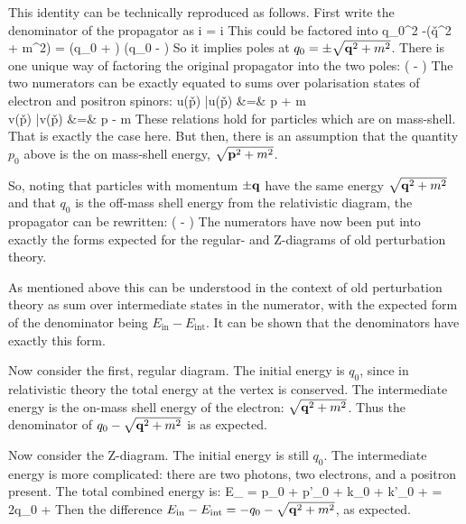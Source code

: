 This identity can be technically reproduced as follows.  First write the denominator of the propagator as
\beq
	i   = i 
\eeq
This could be factored into 
\beq
	q_0^2 -(\v{q}^2 + m^2) = (q_0 + )  (q_0 - )
\eeq
So it implies poles at $q_0 = \pm  \sqrt{\mathbf{q}^2 + m^2}$.  There is one unique way of factoring the original propagator into the two poles:
\beq
		\left(
			- 
		\right)
\eeq
The two numerators can be exactly equated to sums over polarisation states of electron and positron spinors:
\beqa
	\Sigma u(\v{p}) \bar{u}(\v{p}) &=& \gamma \cdot p + m	\\
	\Sigma v(\v{p}) \bar{v}(\v{p}) &=& \gamma \cdot p - m	
\eeqa
These relations hold for particles which are on mass-shell.  That is exactly the case here.  But then, there is an assumption that the quantity $p_0$ above is the on mass-shell energy, $\sqrt{\mathbf{p}^2 + m^2}$.

So, noting that particles with momentum $\pm \mathbf{q}$ have the same energy $\sqrt{\mathbf{q}^2 + m^2}$ and that $q_0$ is the off-mass shell energy from the relativistic diagram, the propagator can be rewritten:
\beq
		\left(
			- 
		\right)
\eeq
The numerators have now been put into exactly the forms expected for the regular- and Z-diagrams of old perturbation theory. 


As mentioned above this can be understood in the context of old perturbation theory as sum over intermediate states in the numerator,  with the expected form of the denominator being $E_\text{in} - E_\text{int}$.  It can be shown that the denominators have exactly this form. 

Now consider the first, regular diagram.  The initial energy is $q_0$, since in relativistic theory the total energy at the vertex is conserved.  The intermediate energy is the on-mass shell energy of the electron: $\sqrt{\mathbf{q}^2+ m^2}$.  Thus the denominator of $q_0 - \sqrt{\mathbf{q}^2+ m^2}$ is as expected.

Now consider the Z-diagram.  The initial energy is still $q_0$.  The intermediate energy is more complicated: there are two photons, two electrons, and a positron present.  The total combined energy is:
\beq
	E_ = p_0 + p'_0 + k_0 + k'_0 +  = 2q_0 +  
\eeq
Then the difference $E_\text{in} - E_\text{int} = -q_0 - \sqrt{\mathbf{q}^2 + m^2}$, as expected.

